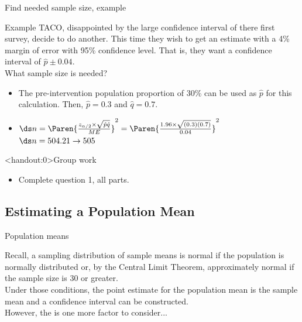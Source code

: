 \documentclass[xcolor=table]{beamer}
\begin{document}
\begin{frame}{Find needed sample size, example}
\begin{exampleblock}{Example}
\large
TACO, disappointed by the large confidence interval of there first survey, decide to do another. This time they wish to get an estimate with a 4\% margin of error with 95\% confidence level. That is, they want a confidence interval of $\hat p \pm 0.04$.\\
\medskip
What sample size is needed?
\begin{itemize}
\pause\item The pre-intervention population proportion of 30\% can be used as $\hat p$ for this calculation. Then, $\hat p = 0.3$ and $\hat q = 0.7$.
\pause\item $\ds n = \Paren{\frac {z_{\alpha/2} \times \sqrt{\hat p \hat q}}{ME}}^2 = \Paren{\frac {1.96 \times \sqrt{(0.3) (0.7)}}{0.04}}^2$\\
\medskip
$\ds n = 504.21 \to 505$ 
\end{itemize}
\end{exampleblock}
\end{frame}

\begin{frame}<handout:0>{Group work}
\begin{block}{}
\large
\begin{itemize}
\item Complete question 1, all parts.
\end{itemize}
\end{block}
\end{frame}


\subsection{Estimating a Population Mean}

\begin{frame}{Population means}

\begin{block}{}
\large
Recall, a sampling distribution of sample means is normal if the population is normally distributed or, by the Central Limit Theorem, approximately normal if the sample size is 30 or greater.\\
\pause\medskip
Under those conditions, the point estimate for the population mean is the sample mean and a confidence interval can be constructed.\\
\pause\medskip
However, the is one more factor to consider...
\end{block}
\end{frame}
\end{document}
